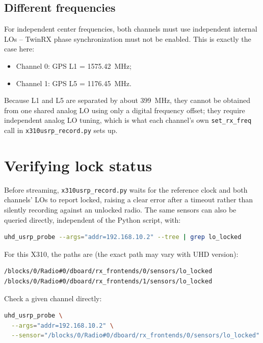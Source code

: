 \documentclass[11pt,a4paper]{article}
\begin{document}
\subsection{Different frequencies}

For independent center frequencies, both channels must use independent internal LOs -- TwinRX phase synchronization must not be enabled. This is exactly the case here:

\begin{itemize}[leftmargin=*]
    \item Channel 0: GPS L1 = 1575.42~MHz;
    \item Channel 1: GPS L5 = 1176.45~MHz.
\end{itemize}

Because L1 and L5 are separated by about 399~MHz, they cannot be obtained from one shared analog LO using only a digital frequency offset; they require independent analog LO tuning, which is what each channel's own \texttt{set\_rx\_freq} call in \texttt{x310usrp\_record.py} sets up.

\section{Verifying lock status}

Before streaming, \texttt{x310usrp\_record.py} waits for the reference clock and both channels' LOs to report locked, raising a clear error after a timeout rather than silently recording against an unlocked radio. The same sensors can also be queried directly, independent of the Python script, with:

\begin{lstlisting}[language=bash]
uhd_usrp_probe --args="addr=192.168.10.2" --tree | grep lo_locked
\end{lstlisting}

For this X310, the paths are (the exact path may vary with UHD version):

\begin{lstlisting}
/blocks/0/Radio#0/dboard/rx_frontends/0/sensors/lo_locked
/blocks/0/Radio#0/dboard/rx_frontends/1/sensors/lo_locked
\end{lstlisting}

Check a given channel directly:

\begin{lstlisting}[language=bash]
uhd_usrp_probe \
  --args="addr=192.168.10.2" \
  --sensor="/blocks/0/Radio#0/dboard/rx_frontends/0/sensors/lo_locked"
\end{lstlisting}
\end{document}

